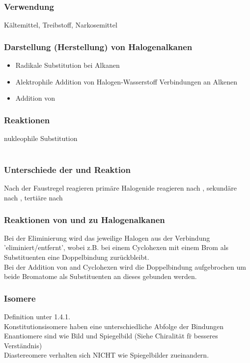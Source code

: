 \documentclass[a4paper, fleqn]{article}
\begin{document}
\subsubsection{Verwendung}
K\"altemittel, Treibstoff, Narkosemittel
\subsubsection{Darstellung (Herstellung) von Halogenalkanen}
\begin{itemize}
  \item Radikale Substitution bei Alkanen
  \item Alektrophile Addition von Halogen-Wasserstoff Verbindungen an Alkenen
  \item Addition von 
\end{itemize}
\subsubsection{Reaktionen}
nukleophile Substitution\\
\\
\subsubsection*{Unterschiede der  und  Reaktion}
Nach der Faustregel reagieren prim\"are Halogenide reagieren nach , sekund\"are nach , terti\"are nach \\
\subsubsection*{Reaktionen von und zu Halogenalkanen}
Bei der Eliminierung wird das jeweilige Halogen aus der Verbindung 'eliminiert/entfernt', wobei z.B. bei einem Cyclohexen mit einem Brom als Substituenten eine Doppelbindung zur\"uckbleibt.\\
Bei der Addition von  and Cyclohexen wird die Doppelbindung aufgebrochen um beide Bromatome als Substituenten an dieses gebunden werden.

\subsubsection{Isomere}
Definition unter 1.4.1.\\
Konstitutionsisomere haben eine unterschiedliche Abfolge der Bindungen\\
Enantiomere sind wie Bild und Spiegelbild (Siehe Chiralit\"at f\"r besseres Verst\"andnis)\\
Diastereomere verhalten sich NICHT wie Spiegelbilder zueinandern.
\end{document}
